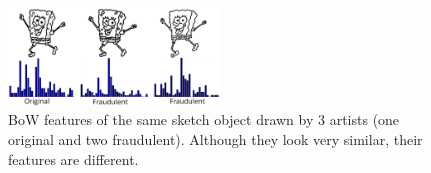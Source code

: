 \vspace{-3mm}
\begin{figure}[!htb]
\centering
\includegraphics[width = 0.5\textwidth]{images/HistogramsComparisonFraud3.png}
\vspace{-5mm}\caption{BoW features of the same sketch object drawn by 3 artists (one original and two fraudulent). Although they look very similar, their features are different.}
\label{HistogramsComparisonFraud} \vspace{-4mm}
\end{figure}





